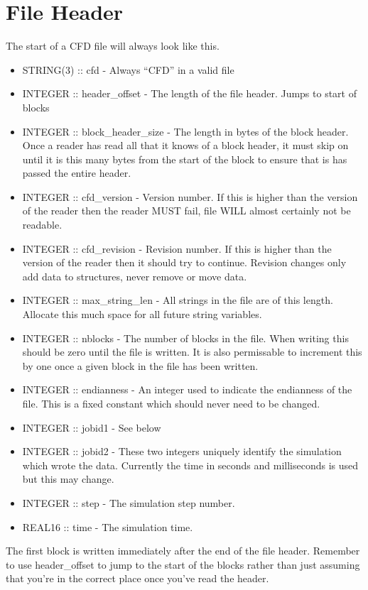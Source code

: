 \documentclass[8pt]{article}
\begin{document}
\section{File Header}
The start of a CFD file will always look like this.\\
\begin{itemize}
\item STRING(3) :: cfd - Always ``CFD'' in a valid file
\item INTEGER :: header\_offset - The length of the file header. Jumps to start of blocks
\item INTEGER :: block\_header\_size - The length in bytes of the block header. Once a reader has read all that it knows of a block header, it must skip on until it is this many bytes from the start of the block to ensure that is has passed the entire header.
\item INTEGER :: cfd\_version - Version number. If this is higher than the version of the reader then the reader MUST fail, file WILL almost certainly not be readable.
\item INTEGER :: cfd\_revision - Revision number. If this is higher than the version of the reader then it should try to continue. Revision changes only add data to structures, never remove or move data.
\item INTEGER :: max\_string\_len - All strings in the file are of this length. Allocate this much space for all future string variables.
\item INTEGER :: nblocks - The number of blocks in the file. When writing this should be zero until the file is written. It is also permissable to increment this by one once a given block in the file has been written.
\item INTEGER :: endianness - An integer used to indicate the endianness of the file. This is a fixed constant which should never need to be changed.
\item INTEGER :: jobid1 - See below
\item INTEGER :: jobid2 - These two integers uniquely identify the simulation which wrote the data. Currently the time in seconds and milliseconds is used but this may change.
\item INTEGER :: step - The simulation step number.
\item REAL16 :: time - The simulation time.
\end{itemize}
The first block is written immediately after the end of the file header. Remember to use header\_offset to jump to the start of the blocks rather than just assuming that you're in the correct place once you've read the header.
\end{document}
